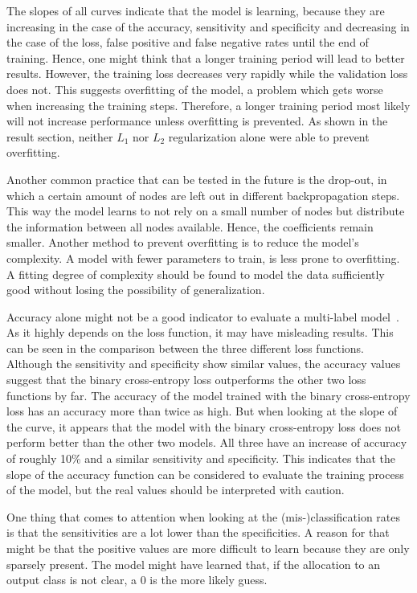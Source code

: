 The slopes of all curves indicate that the model is learning, because they are increasing in the case of the accuracy, sensitivity and specificity and decreasing in the case of the loss, false positive and false negative rates until the end of training. Hence, one might think that a longer training period will lead to better results. However, the training loss decreases very rapidly while the validation loss does not. This suggests overfitting of the model, a problem which gets worse when increasing the training steps. Therefore, a longer training period most likely will not increase performance unless overfitting is prevented. As shown in the result section, neither \(L_1\) nor \(L_2\) regularization alone were able to prevent overfitting.

Another common practice that can be tested in the future is the drop-out, in which a certain amount of nodes are left out in different backpropagation steps. This way the model learns to not rely on a small number of nodes but distribute the information between all nodes available. Hence, the coefficients remain smaller. Another method to prevent overfitting is to reduce the model's complexity. A model with fewer parameters to train, is less prone to overfitting. A fitting degree of complexity should be found to model the data sufficiently good without losing the possibility of generalization.

Accuracy alone might not be a good indicator to evaluate a multi-label model~\citep{gibaja2015}. As it highly depends on the loss function, it may have misleading results. This can be seen in the comparison between the three different loss functions. Although the sensitivity and specificity show similar values, the accuracy values suggest that the binary cross-entropy loss outperforms the other two loss functions by far. The accuracy of the model trained with the binary cross-entropy loss has an accuracy more than twice as high. But when looking at the slope of the curve, it appears that the model with the binary cross-entropy loss does not perform better than the other two models. All three have an increase of accuracy of roughly 10\% and a similar sensitivity and specificity. This indicates that the slope of the accuracy function can be considered to evaluate the training process of the model, but the real values should be interpreted with caution.

One thing that comes to attention when looking at the (mis-)classification rates is that the sensitivities are a lot lower than the specificities. A reason for that might be that the positive values are more difficult to learn because they are only sparsely present. The model might have learned that, if the allocation to an output class is not clear, a 0 is the more likely guess.

